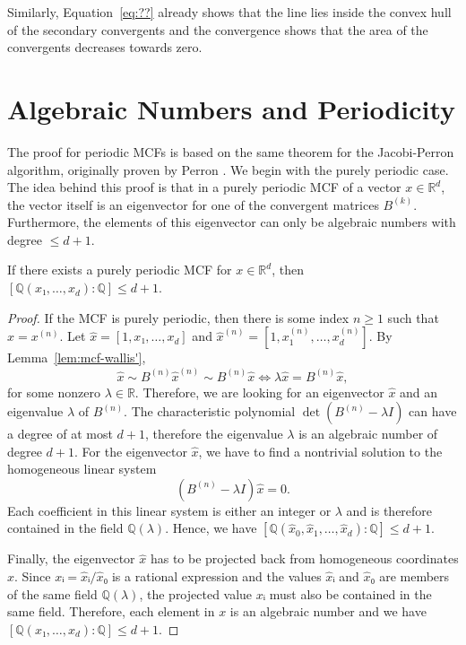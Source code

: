 Similarly,
Equation~\ref{eq:??} already shows that the line lies inside the convex hull of
the secondary convergents
and the convergence shows that the area of the convergents decreases towards zero.
\fi

\section{Algebraic Numbers and Periodicity}
\label{sec:mcf-periodic}

The proof for periodic MCFs is based on the same theorem for the Jacobi-Perron
algorithm, originally proven by Perron \cite{Perron07}.
We begin with the purely periodic case.
The idea behind this proof is that in a purely periodic MCF of a vector $x ∈ ℝ^d$,
the vector itself is an eigenvector for one of the convergent matrices $B^{(k)}$.
Furthermore, the elements of this eigenvector can only be algebraic numbers with degree $≤ d+1$.

\begin{lemma}
  \label{lem:mcf-purely-periodic}
  If there exists a purely periodic MCF for $x ∈ ℝ^d$,
  then $[ℚ(x₁, …, x_d) : ℚ] ≤ d+1$.
\end{lemma}

\begin{proof}
  If the MCF is purely periodic, then there is some index $n ≥ 1$ such that $x = x^{(n)}$.
  Let $\hat x = [1, x₁, …, x_d]$ and $\hat x^{(n)} = [1, x_1^{(n)}, …, x_d^{(n)}]$.
  By Lemma~\ref{lem:mcf-wallis'},
  \[
    \hat x \sim B^{(n)} \hat x^{(n)} \sim B^{(n)} \hat x \iff λ \hat x = B^{(n)} \hat x,
  \]
  for some nonzero $λ ∈ ℝ$.
  Therefore, we are looking for an eigenvector $\hat x$ and an eigenvalue $λ$ of $B^{(n)}$.
  The characteristic polynomial $\det(B^{(n)} - λ I)$ can have a degree of at most $d+1$,
  therefore the eigenvalue $λ$ is an algebraic number of degree $d+1$.
  For the eigenvector $\hat x$, we have to find a nontrivial solution to the
  homogeneous linear system
  \[
    (B^{(n)} - λ I) \hat x = 0.
  \]
  Each coefficient in this linear system is either an integer or $λ$ and is
  therefore contained in the field $ℚ(λ)$.
  Hence, we have $[ℚ(\hat x_0, \hat x_1, …, \hat x_d) : ℚ] ≤ d+1$.

  Finally, the eigenvector $\hat x$ has to be projected back from homogeneous coordinates $x$.
  Since $xᵢ = \hat xᵢ / \hat x₀$ is a rational expression and the values $\hat xᵢ$ and $\hat x₀$ are members of the same field $ℚ(λ)$,
  the projected value $xᵢ$ must also be contained in the same field.
  Therefore, each element in $x$ is an algebraic number
  and we have $[ℚ(x₁, …, x_d) : ℚ] ≤ d+1$.
\end{proof}

